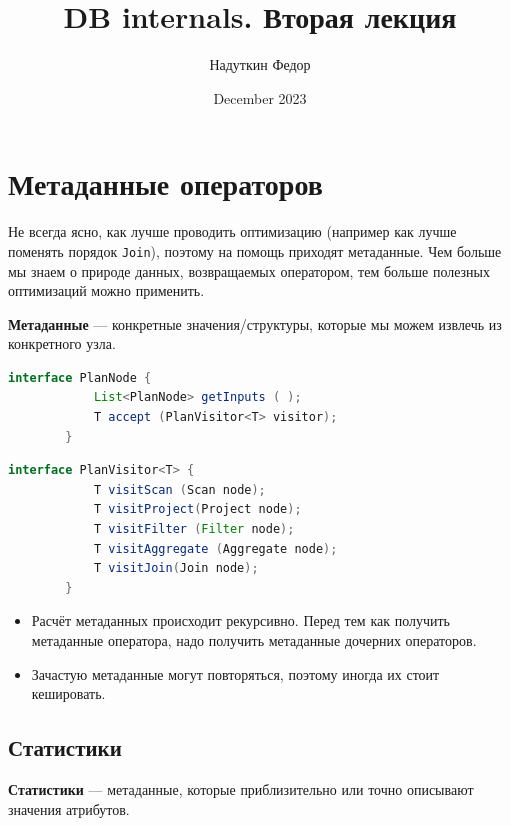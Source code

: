 \documentclass[11pt]{article}
\title{DB internals. Вторая лекция}
\author{Надуткин Федор }
\date{December 2023}
\begin{document}
    \maketitle

    \newpage

    \section*{Метаданные операторов}

    Не всегда ясно, как лучше проводить оптимизацию (например как лучше поменять порядок \texttt{Join}), поэтому на помощь приходят метаданные.
    Чем больше мы знаем о природе данных, возвращаемых оператором, тем больше полезных оптимизаций можно применить.

    \textbf{Метаданные} --- конкретные значения/структуры, которые мы можем извлечь из конкретного узла.

    \begin{lstlisting}[language=Java,label={lst:plan_node}]
        interface PlanNode {
            List<PlanNode> getInputs ( );
            T accept (PlanVisitor<T> visitor);
        }
    \end{lstlisting}

    \begin{lstlisting}[language=Java, label={lst:visitor}]
        interface PlanVisitor<T> {
            T visitScan (Scan node);
            T visitProject(Project node);
            T visitFilter (Filter node);
            T visitAggregate (Aggregate node);
            T visitJoin(Join node);
        }
    \end{lstlisting}

    \begin{itemize}
        \item Расчёт метаданных происходит рекурсивно.
        Перед тем как получить метаданные оператора, надо получить метаданные дочерних операторов.
        \item Зачастую метаданные могут повторяться, поэтому иногда их стоит кешировать.
    \end{itemize}

    \subsection*{Статистики}

    \textbf{Статистики} --- метаданные, которые приблизительно или точно описывают значения атрибутов.
\end{document}
